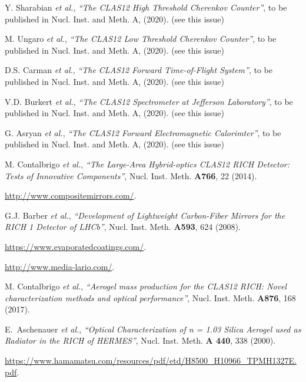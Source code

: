 \documentclass[5p,times,twocolumn]{elsarticle}
\begin{document}
\begin{thebibliography}{00}
Y. Sharabian {\it et al.}, {\it ``The CLAS12 High Threshold Cherenkov Counter''}, 
to be published in Nucl. Inst.  and Meth. A, (2020). (see this issue)
  
M. Ungaro {\it et al.}, {\it ``The CLAS12 Low Threshold Cherenkov Counter''}, 
to be published in Nucl. Inst.  and Meth. A, (2020). (see this issue)

D.S. Carman {\it et al.}, {\it ``The CLAS12 Forward Time-of-Flight System''}, 
to be published in Nucl. Inst.  and Meth. A, (2020). (see this issue)
  
V.D. Burkert {\it et al.}, {\it ``The CLAS12 Spectrometer at Jefferson Laboratory''}, 
to be published in Nucl. Inst.  and Meth. A, (2020). (see this issue)
  
G. Asryan {\it et al.}, {\it ``The CLAS12 Forward Electromagnetic Calorimter''}, 
to be published in Nucl. Inst.  and Meth. A, (2020). (see this issue)
  
M. Contalbrigo {\it et al.}, {\it ``The Large-Area Hybrid-optics CLAS12 RICH Detector: Tests of Innovative Components''},
Nucl. Inst. Meth. {\bf A766}, 22 (2014).

 \url{http://www.compositemirrors.com/}.

G.J. Barber {\it et al.}, {\it ``Development of Lightweight Carbon-Fiber Mirrors for the RICH 1 Detector of LHCb''},
Nucl. Inst. Meth. {\bf A593}, 624 (2008).

 \url{https://www.evaporatedcoatings.com/}.

 \url{http://www.media-lario.com/}.

M. Contalbrigo {\it et al.}, {\it ``Aerogel mass production for the CLAS12 RICH: Novel characterization methods and optical performance''},
Nucl. Inst. Meth. {\bf A876}, 168 (2017).

E.~Aschenauer  {\it et al.}, {\it ``Optical Characterization of n = 1.03 Silica Aerogel used as Radiator in the RICH of HERMES''},
Nucl. Inst. Meth. {\bf A 440}, 338 (2000).

 \url{https://www.hamamatsu.com/resources/pdf/etd/H8500\_H10966\_TPMH1327E.pdf}.
  

\end{thebibliography}
\end{document}
